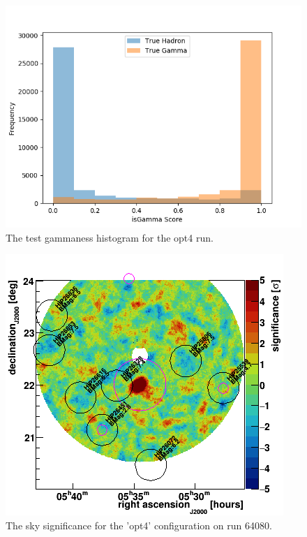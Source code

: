 \begin{figure}[ht] 
        \centering \includegraphics[width=\columnwidth]{figures/crabrun2opt4_hist.png}

        \caption{
                \label{fig:opt4_hist} The test gammaness histogram for the opt4 run.
        }
\end{figure}
\begin{figure}[ht] 
        \centering \includegraphics[width=\columnwidth]{figures/opt4_skysig.png}

        \caption{
                \label{fig:opt4_skysig} The sky significance for the 'opt4' configuration on run 64080.
        }
\end{figure}
